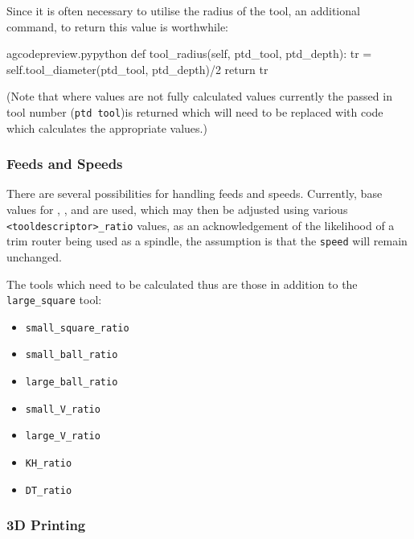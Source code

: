 \documentclass{ltxdoc}
\begin{document}
Since it is often necessary to utilise the radius of the tool, an additional command,  to return this value is worthwhile:
 
\lstset{firstnumber=\thegcpy}
\begin{writecode}{a}{gcodepreview.py}{python}
    def tool_radius(self, ptd_tool, ptd_depth):
        tr = self.tool_diameter(ptd_tool, ptd_depth)/2
        return tr

\end{writecode}
\addtocounter{gcpy}{4}
 
\noindent (Note that where values are not fully calculated values currently the passed in tool number (\verb|ptd tool|)is returned which will need to be replaced with code which calculates the appropriate values.)

\subsubsection{Feeds and Speeds}

There are several possibilities for handling feeds and speeds. Currently, base values for , , and  are used, which may then be adjusted using various \verb|<tooldescriptor>_ratio| values, as an acknowledgement of the likelihood of a trim router being used as a spindle, the assumption is that the \texttt{speed} will remain unchanged.


The tools which need to be calculated thus are those in addition to the \verb|large_square| tool:

\begin{itemize}
\item \verb|small_square_ratio|
\item \verb|small_ball_ratio|
\item \verb|large_ball_ratio|
\item \verb|small_V_ratio|
\item \verb|large_V_ratio|
\item \verb|KH_ratio|
\item \verb|DT_ratio|
\end{itemize}

\subsubsection{3D Printing}
\end{document}

